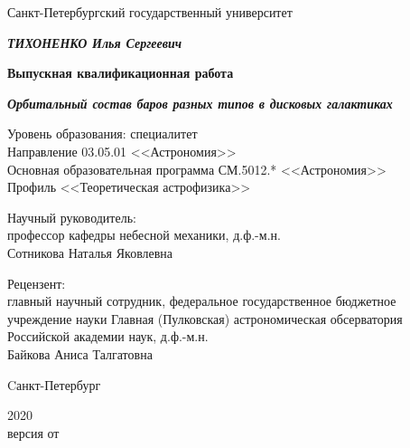 \begin{titlepage}
  \centering
  {Санкт-Петербургский государственный университет \par}
  
  \vspace{2cm}

  {\bfseries \itshape\MakeUppercase{Тихоненко} Илья Сергеевич\par}
  \vspace{0.5\baselineskip}
  {\bfseries Выпускная квалификационная работа\par}
  \vspace{0.5\baselineskip}
  {\bfseries \itshape Орбитальный состав баров разных типов в дисковых галактиках\par}
  \vspace{2cm}
  {
    \begin{spacing}{1.0}
    Уровень образования: специалитет\\
    Направление 03.05.01 <<Астрономия>>\\
    Основная образовательная программа СМ.5012.* <<Астрономия>>\\
    Профиль <<Теоретическая астрофизика>>
    \end{spacing}
  }
  \vspace{1cm}
  \begin{flushright}
    \singlespacing
    \parbox{0.5\textwidth}{
      {Научный руководитель:} \\
      профессор кафедры небесной механики, д.ф.-м.н.\\
      Сотникова Наталья Яковлевна
    }
  \end{flushright}
  \par
  \begin{flushright}
    \singlespacing
    \parbox{0.5\textwidth}{
    {Рецензент:} \\
      главный научный сотрудник,
      федеральное государственное бюджетное учреждение науки Главная (Пулковская) 
      астрономическая обсерватория Российской академии наук,
      д.ф.-м.н.\\
      Байкова Аниса Талгатовна
    }
  \end{flushright}
  
  \vfill
  
  {Cанкт-Петербург \par}
  {2020}\\
  {\small версия от }
  \vspace*{-\baselineskip}
\end{titlepage}
